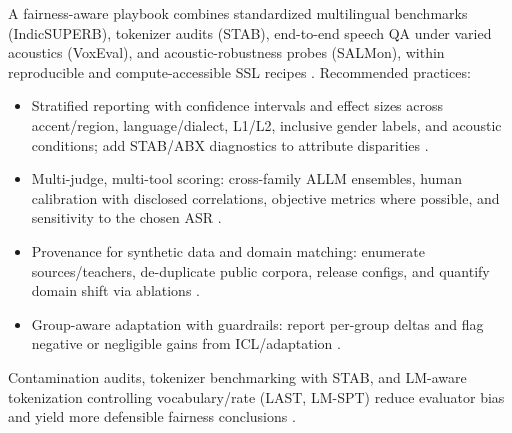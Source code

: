 A fairness-aware playbook combines standardized multilingual benchmarks (IndicSUPERB), tokenizer audits (STAB), end-to-end speech QA under varied acoustics (VoxEval), and acoustic-robustness probes (SALMon), within reproducible and compute-accessible SSL recipes \cite{entry2025indicsuperbspeechprocessinguniversalperf,vashishth2024stabspeechtokenizerassessmentbenchmark,cui2025voxevalbenchmarkingknowledgeunderstandin,maimon2025salmonsuiteacousticlanguagemodelevaluati,chen2023reducingbarriersselfsupervisedlearninghu}. Recommended practices:
\begin{itemize}
\item Stratified reporting with confidence intervals and effect sizes across accent/region, language/dialect, L1/L2, inclusive gender labels, and acoustic conditions; add STAB/ABX diagnostics to attribute disparities \cite{vashishth2024stabspeechtokenizerassessmentbenchmark,fily2024establishingdegreesclosenessbetweenaudio,sicherman2023analysingdiscreteselfsupervisedspeechrep}.
\item Multi-judge, multi-tool scoring: cross-family ALLM ensembles, human calibration with disclosed correlations, objective metrics where possible, and sensitivity to the chosen ASR \cite{li2025televaldynamicbenchmarkdesignedspokenlan,lin2025alignslmtextlessspokenlanguagemodelsrein}.
\item Provenance for synthetic data and domain matching: enumerate sources/teachers, de-duplicate public corpora, release configs, and quantify domain shift via ablations \cite{sun2025llasofoundationalframeworkreproduciblere,wang2023slmbridgethingapbetweenspeechtextfoundat,tseng2025evaluationllmsspeechisoftenflawedtestset}.
\item Group-aware adaptation with guardrails: report per-group deltas and flag negative or negligible gains from ICL/adaptation \cite{roll2025contextlearningboostsspeechrecognitionhu}.
\end{itemize}
Contamination audits, tokenizer benchmarking with STAB, and LM-aware tokenization controlling vocabulary/rate (LAST, LM-SPT) reduce evaluator bias and yield more defensible fairness conclusions \cite{turetzky2024lastlanguagemodelawarespeechtokenization,jo2025lmsptalignedsemanticdistillationspeechto,vashishth2024stabspeechtokenizerassessmentbenchmark,tseng2025evaluationllmsspeechisoftenflawedtestset}.

